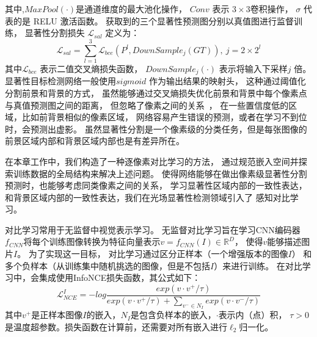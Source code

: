 %
%
%
%
其中,$MaxPool(\cdot)$是通道维度的最大池化操作，
$ Conv $ 表示 $ 3\times 3 $卷积操作，
$ \sigma $ 代表的是 RELU 激活函数。
获取到的三个显著性预测图分别以真值图进行监督训练，
显著性分割损失
$ \mathcal{L}_{sal} $
定义为：
%
%
%
%
\begin{equation}
	\mathcal{L}_{sal} = \sum_{l = 1}^{3}  
	\mathcal{L}_{bce} \left ( P^{l}, DownSample_{j}\left (  GT \right ) 
	\right ), ~ j = 2\times 2^l
	\label{chpt4:eq:loss_sal}
\end{equation}
%
%
%
%
其中$\mathcal{L}_{bce}$ 表示二值交叉熵损失函数，
$DownSample_{j}(\cdot)$ 表示将输入下采样$j$ 倍。
%
%
%
%
%
\label{chap:part4_cons}
% 
% 
% 
% 
显著性目标检测网络一般使用$sigmoid$ 作为输出结果的映射头，
这种通过阈值化分割前景和背景的方式，
虽然能够通过交叉熵损失优化前景和背景中每个像素点与真值预测图之间的距离，
但忽略了像素之间的关系~\cite{zhao2019region}，
在一些置信度低的区域，比如前背景相似的像素区域，
网络容易产生错误的预测，或者在学习不到位时，会预测出虚影。
%
%
%
%
虽然显著性分割是一个像素级的分类任务，但是每张图像的前景区域内部和背景区域内部也是有差异所在。

在本章工作中，我们构造了一种逐像素对比学习的方法，
通过规范嵌入空间并探索训练数据的全局结构来解决上述问题。
使得网络能够在做出像素级显著性分割预测时，也能够考虑同类像素之间的关系，
学习显著性区域内部的一致性表达，
和背景区域内部的一致性表达，我们在光场显著性检测领域引入了
感知对比学习。



对比学习常用于无监督中视觉表示学习。
无监督对比学习旨在学习CNN编码器$f_{CNN}$将每个训练图像转换为特征向量表示$v=f_{CNN}(I) \in \mathbb{R}^{D}$，
使得$v$能够描述图片$I$。
为了实现这一目标，
对比学习通过区分正样本（一个增强版本的图像$I$）
和多个负样本（从训练集中随机挑选的图像，但是不包括$I$）来进行训练。
在对比学习中，会集成使用InfoNCE损失函数，其公式如下：
\begin{equation}
	\mathcal{L} _{NCE}^{I}=-log \frac{exp(v \cdot v^{+ }/\tau )}
{exp(v \cdot v^{+}/\tau )+ \sum_{v^{-}\in N_{I}} exp(v \cdot v^{-}/\tau )} 
\label{chpt4_equ_nce}
\end{equation}
其中$v^{+}$是正样本图像$I$的嵌入，$N_{I}$是包含负样本的嵌入，$\cdot$表示内（点）积，
$\tau >0$是温度超参数。损失函数在计算前，还需要对所有嵌入进行$\ell_{2}$归一化。
\par
% 
% 
% 
% 
% 
% 
% 

